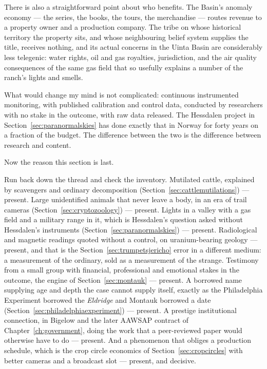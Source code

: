 There is also a straightforward point about who benefits. The Basin's anomaly economy --- the
series, the books, the tours, the merchandise --- routes revenue to a property owner and a
production company. The tribe on whose historical territory the property sits, and whose
neighbouring belief system supplies the title, receives nothing, and its actual concerns in the
Uinta Basin are considerably less telegenic: water rights, oil and gas royalties, jurisdiction,
and the air quality consequences of the same gas field that so usefully explains a number of the
ranch's lights and smells.

What would change my mind is not complicated: continuous instrumented monitoring, with published
calibration and control data, conducted by researchers with no stake in the outcome, with raw
data released. The Hessdalen project in Section~\ref{sec:paranormalskies} has done exactly that in Norway for forty
years on a fraction of the budget. The difference between the two is the difference between
research and content.

Now the reason this section is last.

Run back down the thread and check the inventory. Mutilated cattle, explained by scavengers and
ordinary decomposition (Section~\ref{sec:cattlemutilations}) --- present. Large unidentified
animals that never leave a body, in an era of trail cameras
(Section~\ref{sec:cryptozoology}) --- present. Lights in a valley with a gas field and a
military range in it, which is Hessdalen's question asked without Hessdalen's instruments
(Section~\ref{sec:paranormalskies}) --- present. Radiological and magnetic readings quoted without
a control, on uranium-bearing geology --- present, and that is the
Section~\ref{sec:trumpetsjericho} error in a different medium: a measurement of the ordinary,
sold as a measurement of the strange. Testimony from a small group with financial, professional and
emotional stakes in the outcome, the engine of Section~\ref{sec:montauk} --- present. A borrowed
name supplying age and depth the case cannot supply itself, exactly as the Philadelphia Experiment
borrowed the \emph{Eldridge} and Montauk borrowed a date
(Section~\ref{sec:philadelphiaexperiment}) --- present. A prestige institutional connection, in
Bigelow and the later AAWSAP contract of Chapter~\ref{ch:government}, doing the work that a
peer-reviewed paper would otherwise have to do --- present. And a phenomenon that obliges a
production schedule, which is the crop circle economics of Section~\ref{sec:cropcircles} with
better cameras and a broadcast slot --- present, and decisive.

